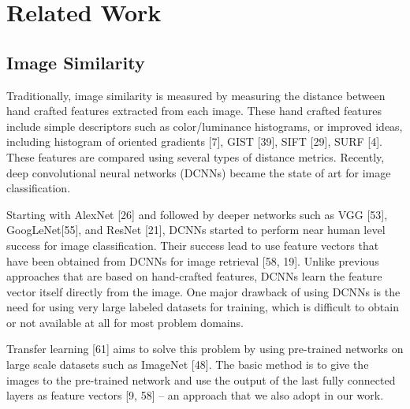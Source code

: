 \chapter{Related Work}
\label{chp:b2}

\section{Image Similarity}
Traditionally, image similarity is measured by measuring the distance between hand crafted features extracted from each image. These hand crafted features include simple descriptors such as color/luminance histograms, or improved ideas, including histogram of oriented gradients [7], GIST [39], SIFT [29], SURF [4]. These features are compared using several types of distance metrics. Recently, deep convolutional neural networks (DCNNs) became the state of art for image classification.

Starting with AlexNet [26] and followed by deeper networks such as VGG [53], GoogLeNet[55], and ResNet [21], DCNNs started to perform near human level success for image classification. Their success lead to use feature vectors that have been obtained from DCNNs for image retrieval [58, 19]. Unlike previous approaches that are based on hand-crafted features, DCNNs learn the feature vector itself directly from the image. One major drawback of using DCNNs is the need for using very large labeled datasets for training, which is difficult to obtain or not available at all for most problem domains.

Transfer learning [61] aims to solve this problem by using pre-trained networks on large scale datasets such as ImageNet [48]. The basic method is to give the images to the pre-trained network and use the output of the last fully connected layers as feature vectors [9, 58] – an approach that we also adopt in our work.

